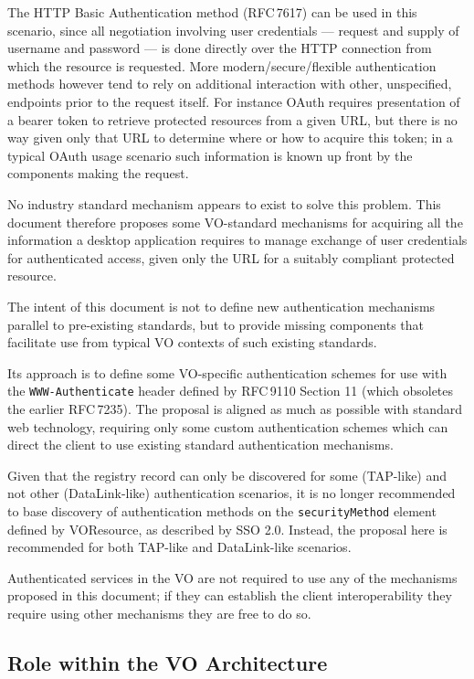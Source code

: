 \documentclass[11pt,a4paper]{ivoa}
\newcommand{\rfc}[1]{RFC\,#1}
\newcommand{\header}[1]{{\tt #1}}
\begin{document}
The HTTP Basic Authentication method (\rfc{7617}) can be used in this scenario,
since all negotiation involving user credentials ---
request and supply of username and password ---
is done directly
over the HTTP connection from which the resource is requested.
More modern/secure/flexible authentication methods however tend to
rely on additional interaction with other, unspecified, endpoints
prior to the request itself.  For instance OAuth requires presentation
of a bearer token to retrieve protected resources from a given URL,
but there is no way given only that URL to determine where or how
to acquire this token;
in a typical OAuth usage scenario such information is known up front
by the components making the request.

No industry standard mechanism appears to exist to solve this problem.
This document therefore proposes some VO-standard mechanisms for
acquiring all the information a desktop application requires
to manage exchange of user credentials for authenticated access,
given only the URL for a suitably compliant protected resource.

The intent of this document is not to define new authentication
mechanisms parallel to pre-existing standards, but to provide
missing components that facilitate use from typical VO contexts
of such existing standards.

Its approach is to define some VO-specific authentication schemes
for use with the \header{WWW-Authenticate} header defined by
\rfc{9110} Section 11 (which obsoletes the earlier \rfc{7235}).
The proposal is aligned as much as possible with standard web
technology, requiring only some custom authentication schemes
which can direct the client to use existing standard authentication
mechanisms.

Given that the registry record can only be discovered for some
(TAP-like) and not other (DataLink-like) authentication scenarios,
it is no longer recommended to base discovery of authentication methods
on the {\tt securityMethod} element
defined by VOResource, as described by SSO 2.0.
Instead, the proposal here is recommended for both TAP-like and DataLink-like
scenarios.

Authenticated services in the VO are not required to use any of the  
mechanisms proposed in this document; if they can establish the
client interoperability they require using other mechanisms
they are free to do so.

\subsection{Role within the VO Architecture}
\end{document}

